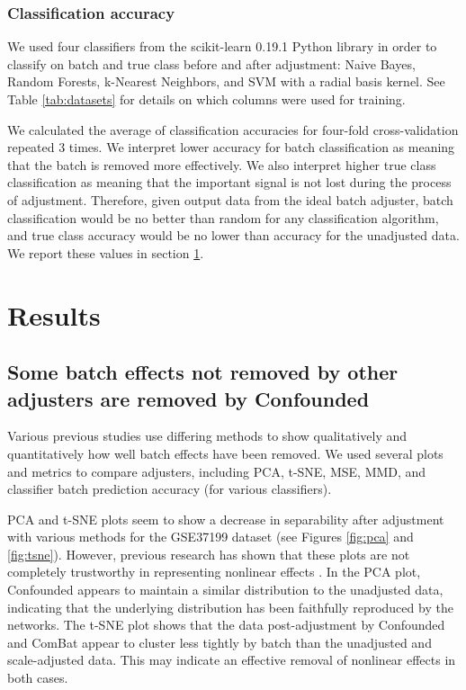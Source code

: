 \documentclass[notitlepage]{article}
\begin{document}
\subsubsection{Classification accuracy}

We used four classifiers from the scikit-learn 0.19.1 Python library \cite{pedregosa_scikit-learn_2011} in order to classify on batch and true class before and after adjustment: Naive Bayes, Random Forests, k-Nearest Neighbors, and SVM with a radial basis kernel.
See Table \ref{tab:datasets} for details on which columns were used for training.

We calculated the average of classification accuracies for four-fold cross-validation repeated 3 times.
We interpret lower accuracy for batch classification as meaning that the batch is removed more effectively.
We also interpret higher true class classification as meaning that the important signal is not lost during the process of adjustment.
Therefore, given output data from the ideal batch adjuster, batch classification would be no better than random for any classification algorithm, and true class accuracy would be no lower than accuracy for the unadjusted data.
We report these values in section \ref{sec:results}.

\section{Results} \label{sec:results}

\subsection{Some batch effects not removed by other adjusters are removed by Confounded}

Various previous studies use differing methods to show qualitatively and quantitatively how well batch effects have been removed.
We used several plots and metrics to compare adjusters, including PCA, t-SNE, MSE, MMD, and classifier batch prediction accuracy (for various classifiers).

PCA and t-SNE plots seem to show a decrease in separability after adjustment with various methods for the GSE37199 dataset (see Figures \ref{fig:pca} and \ref{fig:tsne}).
However, previous research has shown that these plots are not completely trustworthy in representing nonlinear effects \cite{dayton_classifying_2017-1}.
In the PCA plot, Confounded appears to maintain a similar distribution to the unadjusted data, indicating that the underlying distribution has been faithfully reproduced by the networks.
The t-SNE plot shows that the data post-adjustment by Confounded and ComBat appear to cluster less tightly by batch than the unadjusted and scale-adjusted data.
This may indicate an effective removal of nonlinear effects in both cases.
\end{document}
